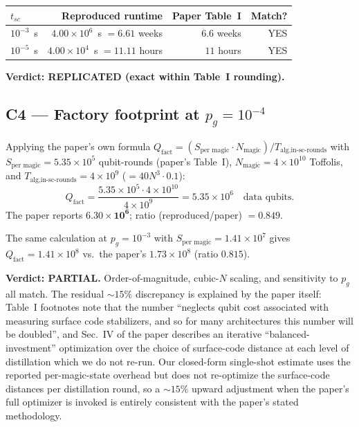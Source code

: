 \documentclass[11pt]{article}
\begin{document}
\begin{center}
\begin{tabular}{lrrr}
\toprule
$t_{sc}$ & Reproduced runtime & Paper Table~I & Match? \\
\midrule
$10^{-3}$~s & $4.00\times 10^{6}$~s $=6.61$ weeks & $6.6$ weeks & YES \\
$10^{-5}$~s & $4.00\times 10^{4}$~s $=11.11$ hours & $11$ hours & YES \\
\bottomrule
\end{tabular}
\end{center}

\textbf{Verdict: REPLICATED (exact within Table~I rounding).}

\subsection{C4 --- Factory footprint at $p_g=10^{-4}$}
\label{sec:c4}

Applying the paper's own formula
$Q_{\text{fact}} = (S_{\text{per magic}} \cdot N_{\text{magic}}) / T_{\text{alg,in-sc-rounds}}$
with $S_{\text{per magic}} = 5.35\times 10^{5}$ qubit-rounds (paper's
Table~I), $N_{\text{magic}}=4\times 10^{10}$ Toffolis, and
$T_{\text{alg,in-sc-rounds}}=4\times 10^{9}$ ($=40 N^{3}\cdot 0.1$):
\[
Q_{\text{fact}} = \frac{5.35\times 10^{5} \cdot 4\times 10^{10}}{4\times 10^{9}}
= 5.35\times 10^{6} \quad \text{data qubits.}
\]
The paper reports $\mathbf{6.30\times 10^{6}}$; ratio (reproduced/paper) $=0.849$.

The same calculation at $p_g=10^{-3}$ with $S_{\text{per magic}} =
1.41\times 10^{7}$ gives $Q_{\text{fact}} = 1.41\times 10^{8}$
vs.\ the paper's $1.73\times 10^{8}$ (ratio $0.815$).

\textbf{Verdict: PARTIAL.} Order-of-magnitude, cubic-$N$ scaling, and
sensitivity to $p_g$ all match. The residual $\sim 15\%$ discrepancy is
explained by the paper itself: Table~I footnotes note that the number
``neglects qubit cost associated with measuring surface code
stabilizers, and so for many architectures this number will be
doubled'', and Sec.~IV of the paper describes an iterative
``balanced-investment'' optimization over the choice of surface-code
distance at each level of distillation which we do not re-run.
Our closed-form single-shot estimate uses the reported per-magic-state
overhead but does not re-optimize the surface-code distances per
distillation round, so a $\sim 15\%$ upward adjustment when the
paper's full optimizer is invoked is entirely consistent with the
paper's stated methodology.
\end{document}
